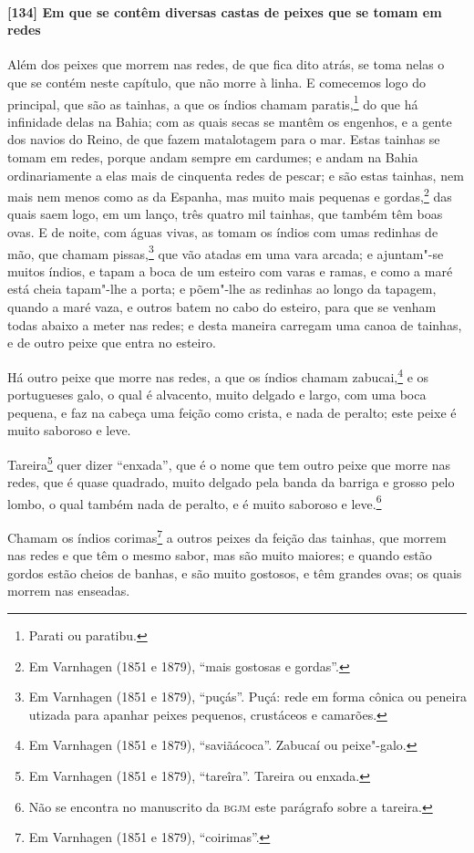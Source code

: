 \begin{linenumbers}
\paragraph{[134] Em que se contêm diversas castas de peixes que se tomam em redes}\quad
Além dos peixes que morrem nas redes, de que fica dito atrás, se toma nelas o que se
contém neste capítulo, que não morre à linha. E comecemos logo do principal, que são as
tainhas, a que os índios chamam paratis,\footnote{ Parati ou paratibu.} do que há
infinidade delas na Bahia; com as quais secas se mantêm os engenhos, e a gente dos navios
do Reino, de que fazem matalotagem para o mar. Estas tainhas se tomam em redes, porque
andam sempre em cardumes; e andam na Bahia ordinariamente a elas mais de cinquenta redes
de pescar; e são estas tainhas, nem mais nem menos como as da Espanha, mas muito mais
pequenas e gordas,\footnote{ Em Varnhagen (1851 e 1879), ``mais gostosas e gordas''.} das
quais saem logo, em um lanço, três quatro mil tainhas, que também têm boas ovas. E de
noite, com águas vivas, as tomam os índios com umas redinhas de mão, que chamam
pissas,\footnote{ Em Varnhagen (1851 e 1879), ``puçás''. Puçá: rede em forma cônica ou
peneira utizada para apanhar peixes pequenos, crustáceos e camarões.} que vão atadas em
uma vara arcada; e ajuntam"-se muitos índios, e tapam a boca de um esteiro com varas e
ramas, e como a maré está cheia tapam"-lhe a porta; e põem"-lhe as redinhas ao longo da
tapagem, quando a maré vaza, e outros batem no cabo do esteiro, para que se venham todas
abaixo a meter nas redes; e desta maneira carregam uma canoa de tainhas, e de outro peixe
que entra no esteiro.

Há outro peixe que morre nas redes, a que os índios chamam zabucai,\footnote{ Em Varnhagen
(1851 e 1879), ``saviãácoca''. Zabucaí ou peixe"-galo.} e os portugueses galo, o qual é
alvacento, muito delgado e largo, com uma boca pequena, e faz na cabeça uma feição como
crista, e nada de peralto; este peixe é muito saboroso e leve.

Tareira\footnote{ Em Varnhagen (1851 e 1879), ``tareîra''. Tareira ou enxada.} quer dizer
``enxada'', que é o nome que tem outro peixe que morre nas redes, que é quase quadrado,
muito delgado pela banda da barriga e grosso pelo lombo, o qual também nada de peralto, e
é muito saboroso e leve.\footnote{ Não se encontra no manuscrito da \textsc{bgjm} este
parágrafo sobre a tareira.}

Chamam os índios corimas\footnote{ Em Varnhagen (1851 e 1879), ``coirimas''.} a outros
peixes da feição das tainhas, que morrem nas redes e que têm o mesmo sabor, mas são muito
maiores; e quando estão gordos estão cheios de banhas, e são muito gostosos, e têm grandes
ovas; os quais morrem nas enseadas.


\end{linenumbers}
